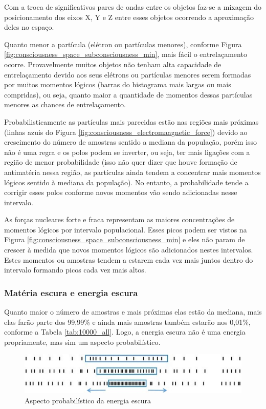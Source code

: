Com a troca de significativos pares de ondas entre os objetos faz-se a mixagem do posicionamento dos eixos X, Y e Z entre esses objetos ocorrendo a aproximação deles no espaço. 

Quanto menor a partícula (elétron ou partículas menores), conforme Figura \ref{fig:consciousness_space_subconsciousness_min}, mais fácil o entrelaçamento ocorre. Provavelmente muitos objetos não tenham alta capacidade de entrelaçamento devido aos seus elétrons ou partículas menores serem formadas por muitos momentos lógicos (barras do histograma mais largas ou mais compridas), ou seja, quanto maior a quantidade de momentos dessas partículas menores as chances de entrelaçamento.

Probabilisticamente as partículas mais parecidas estão nas regiões mais próximas (linhas azuis do Figura \ref{fig:consciousness_electromaagnetic_force}) devido ao crescimento do número de amostras sentido a mediana da população, porém isso não é uma regra e os polos podem se inverter, ou seja, ter mais ligações com a região de menor probabilidade (isso não quer dizer que houve formação de antimatéria nessa região, as partículas ainda tendem a concentrar mais momentos lógicos sentido à mediana da população). No entanto, a probabilidade tende a corrigir esses polos conforme novos momentos vão sendo adicionadas nesse intervalo.

As forças nucleares forte e fraca representam as maiores concentrações de momentos lógicos por intervalo populacional. Esses picos podem ser vistos na Figura \ref{fig:consciousness_space_subconsciousness_min} e eles não param de crescer à medida que novos momentos lógicos são adicionados nestes intervalos. Estes momentos ou amostras tendem a estarem cada vez mais juntos dentro do intervalo formando picos cada vez mais altos.

\subsubsection{Matéria escura e energia escura}
Quanto maior o número de amostras e mais próximas elas estão da mediana, mais elas farão parte dos 99,99\% e ainda mais amostras também estarão nos 0,01\%, conforme a Tabela \ref{tab:10000_all}. Logo, a energia escura não é uma energia propriamente, mas sim um aspecto probabilístico. 
	\begin{figure}[H]
	\caption{Aspecto probabilístico da energia escura}
	\label{fig:consciousness_dark_matter_dark_energy}
	\centering
	\includegraphics[scale=1]{sections/images/consciousness_dark_matter_dark_energy.jpg}
	\end{figure}

